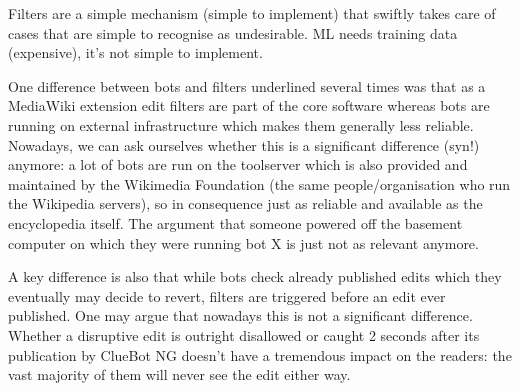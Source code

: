 Filters are a simple mechanism (simple to implement) that swiftly takes care of cases that are simple to recognise as undesirable.
ML needs training data (expensive), it's not simple to implement.

\begin{comment}
maybe it's a historical phenomenon (in many regards):
* perhaps there were differences that are not essential anymore, such as:
  * on which infrastructure does it run (part of the core software vs own computers of the bot operators)
  * filters are triggered *before* an edit is even published, whereas bots (and tools) can revert an edit post factum. Is this really an important difference in times when bots need a couple of seconds to revert an edit?
* perhaps the extension was implemented because someone was capable of implementing and working well with this type of systems so they just went and did it (do-ocracy; Wikipedia as a collaborative volunteer project);
* perhaps it still exists in times of fancier machine learning based tools (or bots) because rule-based systems are more transparent/easily understandable for humans and writing a regex is simpler than coding a bot.
* hypothesis: it is easier to set up a filter than program a bot. Setting up a filter requires "only" understanding of regular expressions. Programming a bot requires knowledge of a programming language and understanding of the API.
\end{comment}

One difference between bots and filters underlined several times was that as a MediaWiki extension edit filters are part of the core software whereas bots are running on external infrastructure which makes them generally less reliable.
Nowadays, we can ask ourselves whether this is a significant difference (syn!) anymore:
a lot of bots are run on the toolserver which is also provided and maintained by the Wikimedia Foundation (the same people/organisation who run the Wikipedia servers), so in consequence just as reliable and available as the encyclopedia itself.
The argument that someone powered off the basement computer on which they were running bot X is just not as relevant anymore.


A key difference is also that while bots check already published edits which they eventually may decide to revert, filters are triggered before an edit ever published.
One may argue that nowadays this is not a significant difference.
Whether a disruptive edit is outright disallowed or caught 2 seconds after its publication by ClueBot NG doesn't have a tremendous impact on the readers:
the vast majority of them will never see the edit either way.

